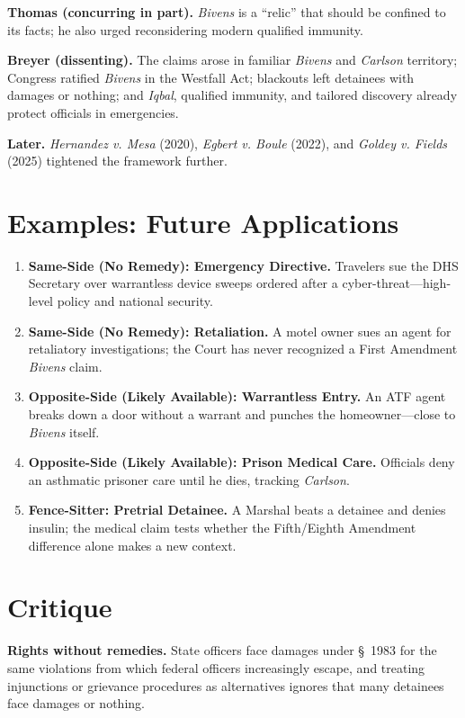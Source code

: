 \documentclass[12pt]{article}
\begin{document}
\textbf{Thomas (concurring in part).} \textit{Bivens} is a ``relic'' that should be confined to its facts; he also urged reconsidering modern qualified immunity.

\textbf{Breyer (dissenting).} The claims arose in familiar \textit{Bivens} and \textit{Carlson} territory; Congress ratified \textit{Bivens} in the Westfall Act; blackouts left detainees with damages or nothing; and \textit{Iqbal}, qualified immunity, and tailored discovery already protect officials in emergencies.

\textbf{Later.} \textit{Hernandez v. Mesa} (2020), \textit{Egbert v. Boule} (2022), and \textit{Goldey v. Fields} (2025) tightened the framework further.

\section{Examples: Future Applications}

\begin{enumerate}
\item \textbf{Same-Side (No Remedy): Emergency Directive.} Travelers sue the DHS Secretary over warrantless device sweeps ordered after a cyber-threat---high-level policy and national security.
\item \textbf{Same-Side (No Remedy): Retaliation.} A motel owner sues an agent for retaliatory investigations; the Court has never recognized a First Amendment \textit{Bivens} claim.
\item \textbf{Opposite-Side (Likely Available): Warrantless Entry.} An ATF agent breaks down a door without a warrant and punches the homeowner---close to \textit{Bivens} itself.
\item \textbf{Opposite-Side (Likely Available): Prison Medical Care.} Officials deny an asthmatic prisoner care until he dies, tracking \textit{Carlson}.
\item \textbf{Fence-Sitter: Pretrial Detainee.} A Marshal beats a detainee and denies insulin; the medical claim tests whether the Fifth/Eighth Amendment difference alone makes a new context.
\end{enumerate}

\section{Critique}

\textbf{Rights without remedies.} State officers face damages under \S~1983 for the same violations from which federal officers increasingly escape, and treating injunctions or grievance procedures as alternatives ignores that many detainees face damages or nothing.
\end{document}
